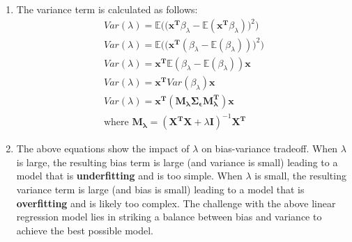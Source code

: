 \documentclass[12pt]{article}
\begin{document}
\begin{enumerate}[label=\alph*.]
	\item The variance term is calculated as follows:
	\begin{gather*}
		Var(\lambda) =  \mathbb{E}\bigg( \big( \mathbf{x^T} \beta_\lambda - \mathbb{E}( \mathbf{x^T} \beta_\lambda ) \big)^2 \bigg) \\
		Var(\lambda) =  \mathbb{E}\bigg( \big( \mathbf{x^T} ( \beta_\lambda - \mathbb{E}( \beta_\lambda )) \big)^2 \bigg) \\
		Var(\lambda) =  \mathbf{x^T} \mathbb{E}( \beta_\lambda - \mathbb{E}( \beta_\lambda )) \mathbf{x} \\
		Var(\lambda) =  \mathbf{x^T} Var( \beta_\lambda ) \mathbf{x} \\
		Var(\lambda) =  \mathbf{x^T} (\mathbf{M_\lambda \Sigma_\epsilon M_\lambda^T}) \mathbf{x} \\
		\text{where } \mathbf{M_\lambda } = (\mathbf{X^T X} + \lambda \mathbf{I})^{-1}  \mathbf{X^T}
	\end{gather*}

	\item The above equations show the impact of $\lambda$ on bias-variance tradeoff. When $\lambda$ is large, the resulting bias term is large (and variance is small) leading to a model that is \textbf{underfitting} and is too simple. When $\lambda$ is small, the resulting variance term is large (and bias is small) leading to a model that is \textbf{overfitting} and is likely too complex. The challenge with the above linear regression model lies in striking a balance between bias and variance to achieve the best possible model.
\end{enumerate}
\end{document}
